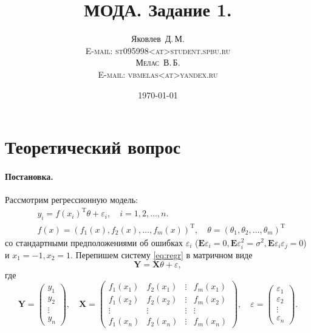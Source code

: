 \documentclass[specialist, subf, href, 12pt]{article}
\title{\bf МОДА. Задание 1.}
\author{Яковлев~Д.\,М.\\\scshape E-mail: st095998<at>student.spbu.ru\vspace*{1cm}\\Мелас~В.\,Б.\\\scshape E-mail: vbmelas<at>yandex.ru}
\date{\today}
\newenvironment{statement}{\paragraph{Постановка.}}{\hfill}
\begin{document}
	\maketitle
	\tableofcontents
	\section{Теоретический вопрос}
	\begin{statement}
			Рассмотрим регрессионную модель:
		\begin{align*}
			&y_i=f(x_i)^\mathrm{T}\theta + \varepsilon_i,\quad i=1,2,\dots,n.\\
			&f(x)=(f_1(x),f_2(x),\dots,f_m(x))^\mathrm{T},\quad\theta=(\theta_1, \theta_2,\dots,\theta_m)^\mathrm{T}
		\end{align*}
		со стандартными предположениями об ошибках $\varepsilon_i$ ($\mathbf{E}\varepsilon_i=0,\mathbf{E}\varepsilon_i^2=\sigma^2,\mathbf{E}\varepsilon_i\varepsilon_j=0$) и $x_1=-1,x_2=1$. Перепишем систему \eqref{eq:regr} в матричном виде
		\begin{equation*}
			\bm{Y} = \bm{X}\theta+\varepsilon,
		\end{equation*} 
		где
		\begin{equation*}
			\bm{Y}=\begin{pmatrix}
				y_1\\
				y_2\\
				\vdots\\
				y_n
			\end{pmatrix},\quad\bm{X}=\begin{pmatrix}
				f_1(x_1)&f_2(x_1)&\vdots&f_m(x_1)\\
				f_1(x_2)&f_2(x_2)&\vdots&f_m(x_2)\\
				\vdots&\vdots&\vdots&\vdots\\
				f_1(x_n)&f_2(x_n)&\vdots&f_m(x_n)
			\end{pmatrix},\quad\varepsilon=\begin{pmatrix}
				\varepsilon_1\\
				\varepsilon_2\\
				\vdots\\
				\varepsilon_n
			\end{pmatrix}.
		\end{equation*} 
	\end{statement}
\end{document}
